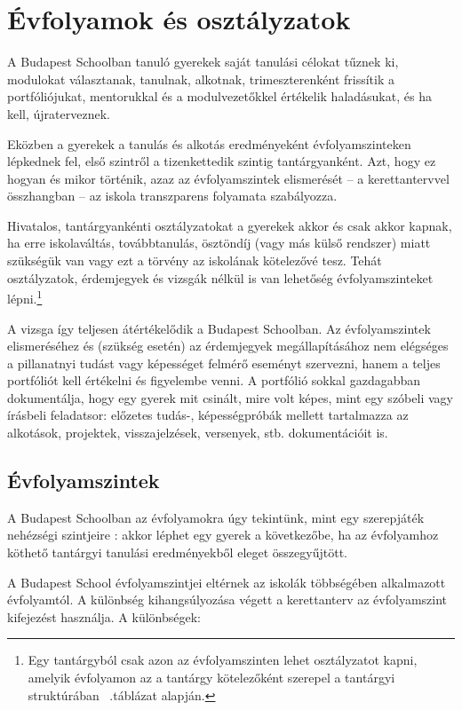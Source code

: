 \section{Évfolyamok és osztályzatok}
\label{sec:evfolyamok_osztalyzatok}
A Budapest Schoolban tanuló gyerekek saját tanulási célokat tűznek ki, modulokat választanak, tanulnak, alkotnak, trimeszterenként frissítik a portfóliójukat, mentorukkal és a modulvezetőkkel értékelik haladásukat, és ha kell, újraterveznek.

Eközben a gyerekek a tanulás és alkotás eredményeként évfolyamszinteken lépkednek fel, első szintről a tizenkettedik szintig tantárgyanként. Azt, hogy ez hogyan és mikor történik, azaz az évfolyamszintek elismerését -- a kerettantervvel összhangban -- az iskola transzparens folyamata szabályozza.

Hivatalos, tantárgyankénti osztályzatokat a gyerekek akkor és csak akkor kapnak, ha erre iskolaváltás, továbbtanulás, ösztöndíj (vagy más külső rendszer) miatt szükségük van vagy ezt a törvény az iskolának kötelezővé tesz. Tehát osztályzatok, érdemjegyek és vizsgák nélkül is van lehetőség évfolyamszinteket lépni.\footnote{Egy tantárgyból csak azon az évfolyamszinten lehet osztályzatot kapni, amelyik évfolyamon az a tantárgy kötelezőként szerepel a tantárgyi struktúrában ~.táblázat alapján.}

A vizsga így teljesen átértékelődik a Budapest Schoolban. Az évfolyamszintek elismeréséhez és (szükség esetén) az érdemjegyek megállapításához nem elégséges a pillanatnyi tudást vagy képességet felmérő eseményt szervezni, hanem a teljes portfóliót kell értékelni és figyelembe venni. A portfólió sokkal gazdagabban dokumentálja, hogy egy gyerek mit csinált, mire volt képes, mint egy szóbeli vagy írásbeli feladatsor: előzetes tudás-, képességpróbák mellett tartalmazza az alkotások, projektek, visszajelzések, versenyek, stb. dokumentációit is.

\subsection{Évfolyamszintek}
\label{sec:evfolyamok}

A Budapest Schoolban az évfolyamokra úgy tekintünk, mint egy szerepjáték nehézségi szintjeire \citep{wiki:game_levels}: akkor léphet egy gyerek a következőbe, ha az évfolyamhoz köthető tantárgyi tanulási eredményekből eleget összegyűjtött.

A Budapest School évfolyamszintjei eltérnek az iskolák többségében alkalmazott évfolyamtól. A különbség kihangsúlyozása végett a kerettanterv az évfolyamszint kifejezést használja. A különbségek:

